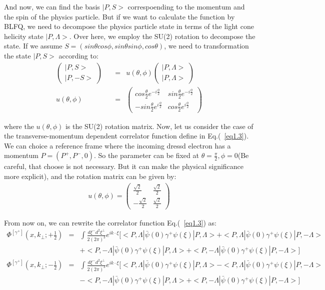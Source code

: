 \documentclass[a4paper,12pt]{article}
\begin{document}
And now, we can find the basis $|P,S>$ correspoending to the momentum and the spin of the
 physics particle. But if we want to calculate the function by BLFQ, we need to
 decompose the physics particle state in terms of the light cone helicity state $|P,\Lambda>$.
 Over here, we employ the SU(2) rotation to decompose the state.
 If we assume $S=(sin\theta cos \phi, sin\theta sin \phi, cos \theta)$, we need to transformation the state $|P,S>$ according to:
\begin{eqnarray}
\begin{pmatrix}
|P,S> \\ |P,-S>
\end{pmatrix}\quad
&=& u(\theta, \phi)
\begin{pmatrix}
|P,\Lambda> \\ |P,\Lambda>
\end{pmatrix}\\
u(\theta ,\phi) &=& \begin{pmatrix}
cos \frac{\theta}{2} e^{-i\frac{\phi}{2}} & sin \frac{\theta}{2} e^{-i\frac{\phi}{2}} \\
-sin \frac{\theta}{2} e^{i\frac{\phi}{2}} & cos \frac{\theta}{2} e^{i\frac{\phi}{2}}
\end{pmatrix}\
\end{eqnarray}

where the $u(\theta, \phi)$ is the SU(2) rotation matrix.
Now, let us consider the case of the transverse-momentum dependent correlator function define in Eq.(~\ref{eq1.3}).
We can choice a reference frame where the incoming dressd electron has a momentum $P=(P^+,P^-,0)$.
So the parameter can be fixed at $\theta = \frac{\pi}{2}, \phi = 0$(Be careful, that choose is not necessary. But it can make the physical significance more explicit), and the rotation matrix can be given by:
\begin{eqnarray}
u(\theta,\phi)=\begin{pmatrix}
\frac{\sqrt{2}}{2} & \frac{\sqrt{2}}{2} \\ -\frac{\sqrt{2}}{2} & \frac{\sqrt{2}}{2}
\end{pmatrix}\label{eq1.5}\
\end{eqnarray}

From now on, we can rewrite the correlator function Eq.(~\ref{eq1.3}) as:
\begin{eqnarray}
\Phi^{[\gamma^+]}(x,k_{\perp};+\frac{1}{2})&=& \int \frac{d \xi^- d^2 \xi^{\perp}}{2(2\pi)^3} e^{ik \cdot \xi} [<P,\Lambda|\bar{\psi}(0)\gamma^+\psi(\xi)|P,\Lambda>+<P,\Lambda|\bar{\psi}(0)\gamma^+\psi(\xi)|P,-\Lambda>\nonumber\\&&+<P,-\Lambda|\bar{\psi}(0)\gamma^+\psi(\xi)|P,\Lambda>+<P,-\Lambda|\bar{\psi}(0)\gamma^+\psi(\xi)|P,-\Lambda>]\nonumber\\
\Phi^{[\gamma^+]}(x,k_{\perp};-\frac{1}{2}) &=& \int \frac{d \xi^- d^2 \xi^{\perp}}{2(2\pi)^3} e^{ik \cdot \xi} [<P,\Lambda|\bar{\psi}(0)\gamma^+\psi(\xi)|P,\Lambda>-<P,\Lambda|\bar{\psi}(0)\gamma^+\psi(\xi)|P,-\Lambda>\nonumber\\&&-<P,-\Lambda|\bar{\psi}(0)\gamma^+\psi(\xi)|P,\Lambda>+<P,-\Lambda|\bar{\psi}(0)\gamma^+\psi(\xi)|P,-\Lambda>]\label{eq1.6}\
\end{eqnarray}
\end{document}
